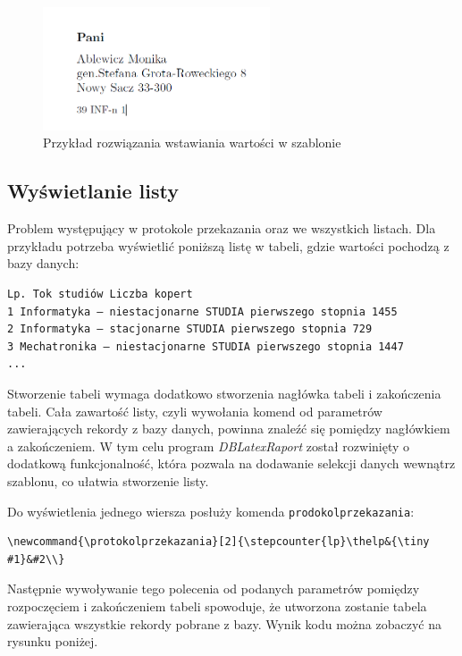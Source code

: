 \begin{figure}[h]
    \centering
    \label{fig:wstawianie}
    \includegraphics[width=0.6\textwidth]{rys/szablony/wstawianie.png}
    \caption{Przykład rozwiązania wstawiania wartości w szablonie}
\end{figure}



 
 \subsection{Wyświetlanie listy}
Problem występujący w protokole przekazania oraz we wszystkich listach. Dla przykładu potrzeba wyświetlić poniższą listę w tabeli, gdzie wartości pochodzą z bazy danych:
\begin{lstlisting}
Lp. Tok studiów Liczba kopert
1 Informatyka — niestacjonarne STUDIA pierwszego stopnia 1455
2 Informatyka — stacjonarne STUDIA pierwszego stopnia 729
3 Mechatronika — niestacjonarne STUDIA pierwszego stopnia 1447
...
\end{lstlisting}
\vspace{5mm}
\par
Stworzenie tabeli wymaga dodatkowo stworzenia nagłówka tabeli i zakończenia tabeli. Cała zawartość listy, czyli wywołania komend  od parametrów zawierających rekordy z bazy danych, powinna znaleźć się pomiędzy nagłówkiem a zakończeniem. W tym celu program \emph{DBLatexRaport} został rozwinięty o dodatkową funkcjonalność, która pozwala na dodawanie selekcji danych wewnątrz szablonu, co ułatwia stworzenie listy. 
\par
Do wyświetlenia jednego wiersza posłuży komenda \texttt{prodokolprzekazania}:
\vspace{5mm}
\begin{lstlisting}
\newcommand{\protokolprzekazania}[2]{\stepcounter{lp}\thelp&{\tiny #1}&#2\\}
\end{lstlisting}
\vspace{3mm}
\par
Następnie wywoływanie tego polecenia od podanych parametrów pomiędzy rozpoczęciem i zakończeniem tabeli spowoduje, że utworzona zostanie tabela zawierająca wszystkie rekordy pobrane z bazy. Wynik kodu można zobaczyć na rysunku poniżej.
